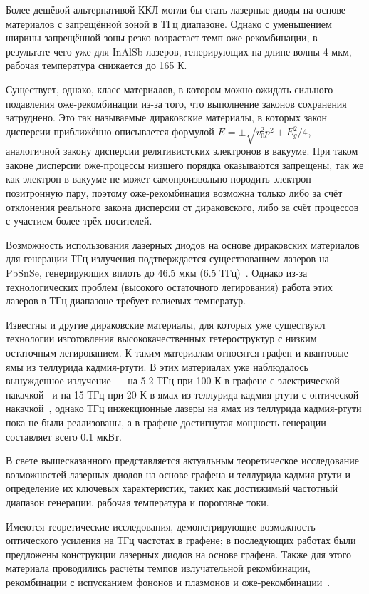 Более дешёвой альтернативой ККЛ могли бы стать лазерные диоды на основе материалов с запрещённой зоной в ТГц диапазоне. Однако с уменьшением ширины запрещённой зоны резко возрастает темп оже-рекомбинации, в результате чего уже для InAlSb лазеров, генерирующих на длине волны 4 мкм, рабочая температура снижается до 165 К.

Существует, однако, класс материалов, в котором можно ожидать сильного подавления оже-рекомбинации из-за того, что выполнение законов сохранения затруднено. Это так называемые дираковские материалы, в которых закон дисперсии приближённо описывается формулой $E = \pm\sqrt{v_0^2 p^2 + E_g^2/4}$, аналогичной закону дисперсии релятивистских электронов в вакууме. При таком законе дисперсии оже-процессы низшего порядка оказываются запрещены, так же как электрон в вакууме не может самопроизвольно породить электрон-позитронную пару, поэтому оже-рекомбинация возможна только либо за счёт отклонения реального закона дисперсии от дираковского, либо за счёт процессов с участием более трёх носителей.

Возможность использования лазерных диодов на основе дираковских материалов для генерации ТГц излучения подтверждается существованием лазеров на PbSnSe, генерирующих вплоть до 46.5 мкм (6.5 ТГц)~\cite{lead_salt_record_wavelength}. Однако из-за технологических проблем (высокого остаточного легирования) работа этих лазеров в ТГц диапазоне требует гелиевых температур.

Известны и другие дираковские материалы, для которых уже существуют технологии изготовления высококачественных гетероструктур с низким остаточным легированием. К таким материалам относятся графен и квантовые ямы из теллурида кадмия-ртути. В этих материалах уже наблюдалось вынужденное излучение --- на 5.2 ТГц при 100 К в графене с электрической накачкой~\cite{graphene_lasing} и на 15 ТГц при 20 К в ямах из теллурида кадмия-ртути с оптической накачкой~\cite{HgCdTe-stimulated_emission}, однако ТГц инжекционные лазеры на ямах из теллурида кадмия-ртути пока не были реализованы, а в графене достигнутая мощность генерации составляет всего 0.1 мкВт.

В свете вышесказанного представляется актуальным теоретическое исследование возможностей лазерных диодов на основе графена и теллурида кадмия-ртути и определение их ключевых характеристик, таких как достижимый частотный диапазон генерации, рабочая температура и пороговые токи.

{\previouswork}
Имеются теоретические исследования, демонстрирующие возможность оптического усиления на ТГц частотах в графене; в последующих работах были предложены конструкции лазерных диодов на основе графена. Также для этого материала проводились расчёты темпов излучательной рекомбинации, рекомбинации с испусканием фононов и плазмонов и оже-рекомбинации~\cite{Rana-Auger,Tomadin-theory,Malic-dynamic}.

